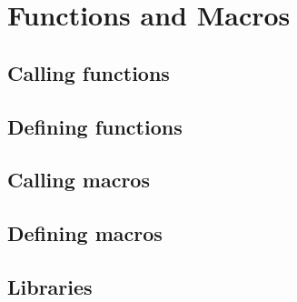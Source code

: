 \section{Functions and Macros}
\label{functionsAndMacros}



\subsection{Calling functions}
\label{functionsAndMacros.callingFunctions}


\subsection{Defining functions}
\label{functionsAndMacros.definingFunctions}


\subsection{Calling macros}
\label{functionsAndMacros.calling}



\subsection{Defining macros}
\label{functionsAndMacros.definingMacros}

\subsection{Libraries}
\label{functionsAndMacros.libraries}
